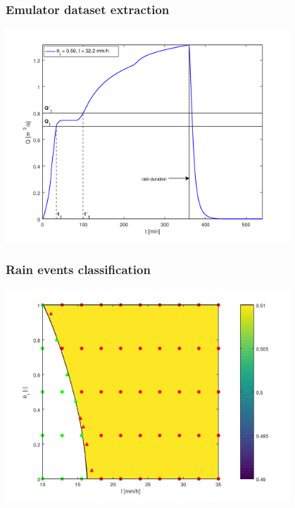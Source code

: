 \documentclass[xcolor=dvipsnames, USenglish]{beamer}  %
\begin{document}
  \begin{frame}
    \frametitle{Emulator dataset extraction}
    \centering
    \includegraphics[width=0.8\textwidth]{img/hydrograph.png}
  \end{frame}


  \begin{frame}
    \frametitle{Rain events classification}
    \centering
    \includegraphics[width=0.8\textwidth]{img/classification.png}
  \end{frame}
\end{document}
